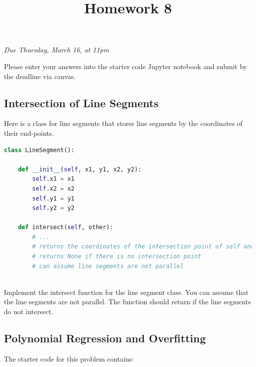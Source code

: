 \documentclass[letterpaper,11pt]{amsart}
\title{Homework 8}
\date{}
\theoremstyle{plain}
\theoremstyle{definition}
\begin{document}
\maketitle
\begin{center}
  \emph{Due Thursday, March 16, at 11pm}
  \vspace{0.3in}
  \end{center}


\noindent Please enter your answers into the starter code Jupyter notebook and submit by the deadline via canvas. 

\subsection*{Intersection of Line Segments} Here is a class for line segments that stores line segments by the coordinates of their end-points.  

\begin{lstlisting}[language=Python]
class LineSegment():
    
    def __init__(self, x1, y1, x2, y2):
        self.x1 = x1
        self.x2 = x2
        self.y1 = y1
        self.y2 = y2
    
    def intersect(self, other):
        # ...
        # returns the coordinates of the intersection point of self and other
        # returns None if there is no intersection point
        # can assume line segments are not parallel
  
\end{lstlisting}

Implement the intersect function for the line segment class. You can assume that the line segments are not parallel. The function should return  if the line segments do not intersect.  

\subsection*{Polynomial Regression and Overfitting} The starter code for this problem contains: 
\end{document}
